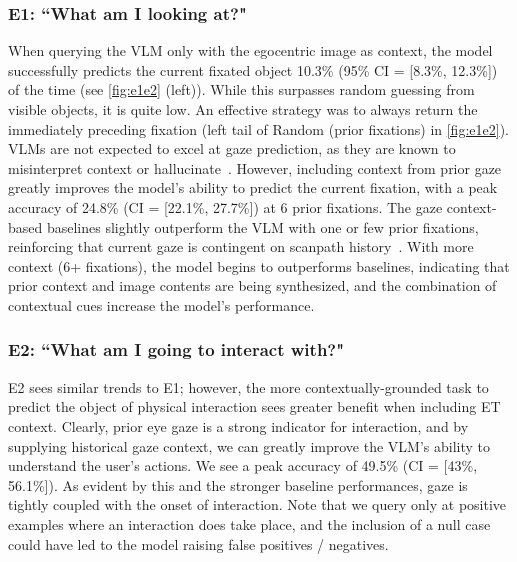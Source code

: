 \subsubsection{E1: ``What am I looking at?"}

When querying the VLM only with the egocentric image as context, the model successfully predicts the current fixated object 10.3\% (95\% CI = [8.3\%, 12.3\%]) of the time (see \autoref{fig:e1e2} (left)).  While this surpasses random guessing from visible objects, it is quite low.  An effective strategy was to always return the immediately preceding fixation (left tail of Random (prior fixations) in \autoref{fig:e1e2}).  VLMs are not expected to excel at gaze prediction, as they are known to misinterpret context or hallucinate~\cite{cui_holistic_2023, leng_hallucinations_2024}.  However, including context from prior gaze greatly improves the model's ability to predict the current fixation, with a peak accuracy of 24.8\% (CI = [22.1\%, 27.7\%]) at 6 prior fixations.  The gaze context-based baselines slightly outperform the VLM with one or few prior fixations, reinforcing that current gaze is contingent on scanpath history~\cite{burlingham_laziness_2024, burlingham_scanpaths_2024}.  With more context (6+ fixations), the model begins to outperforms baselines, indicating that prior context and image contents are being synthesized, and the combination of contextual cues increase the model's performance.

\subsubsection{E2: ``What am I going to interact with?"}

E2 sees similar trends to E1; however, the more contextually-grounded task to predict the object of physical interaction sees greater benefit when including ET context. Clearly, prior eye gaze is a strong indicator for interaction, and by supplying historical gaze context, we can greatly improve the VLM's ability to understand the user's actions. We see a peak accuracy of 49.5\% (CI = [43\%, 56.1\%]). As evident by this and the stronger baseline performances, gaze is tightly coupled with the onset of interaction. Note that we query only at positive examples where an interaction does take place, and the inclusion of a null case could have led to the model raising false positives / negatives.



